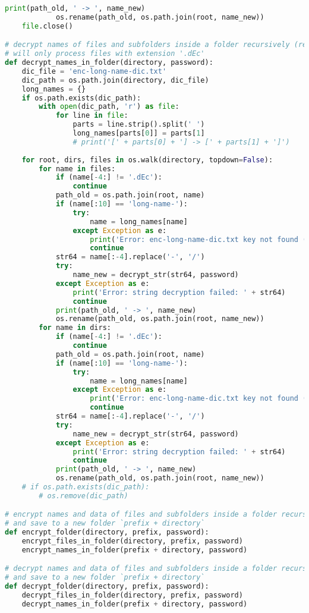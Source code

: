 \begin{lstlisting}[language=python,caption=encrypt.py]
			print(path_old, ' -> ', name_new)
			os.rename(path_old, os.path.join(root, name_new))
	file.close()

# decrypt names of files and subfolders inside a folder recursively (rename)
# will only process files with extension '.dEc'
def decrypt_names_in_folder(directory, password):
	dic_file = 'enc-long-name-dic.txt'
	dic_path = os.path.join(directory, dic_file)
	long_names = {}
	if os.path.exists(dic_path):
		with open(dic_path, 'r') as file:
			for line in file:
				parts = line.strip().split(' ')
				long_names[parts[0]] = parts[1]
				# print('[' + parts[0] + '] -> [' + parts[1] + ']')
				
	for root, dirs, files in os.walk(directory, topdown=False):
		for name in files:
			if (name[-4:] != '.dEc'):
			 	continue
			path_old = os.path.join(root, name)
			if (name[:10] == 'long-name-'):
				try:
					name = long_names[name]
				except Exception as e:
					print('Error: enc-long-name-dic.txt key not found (will skip): ' + name)
					continue
			str64 = name[:-4].replace('-', '/')
			try:
				name_new = decrypt_str(str64, password)
			except Exception as e:
				print('Error: string decryption failed: ' + str64)
				continue
			print(path_old, ' -> ', name_new)
			os.rename(path_old, os.path.join(root, name_new))
		for name in dirs:
			if (name[-4:] != '.dEc'):
			 	continue
			path_old = os.path.join(root, name)
			if (name[:10] == 'long-name-'):
				try:
					name = long_names[name]
				except Exception as e:
					print('Error: enc-long-name-dic.txt key not found (will skip): ' + name)
					continue
			str64 = name[:-4].replace('-', '/')
			try:
				name_new = decrypt_str(str64, password)
			except Exception as e:
				print('Error: string decryption failed: ' + str64)
				continue
			print(path_old, ' -> ', name_new)
			os.rename(path_old, os.path.join(root, name_new))
	# if os.path.exists(dic_path):
		# os.remove(dic_path)

# encrypt names and data of files and subfolders inside a folder recursively
# and save to a new folder `prefix + directory`
def encrypt_folder(directory, prefix, password):
	encrypt_files_in_folder(directory, prefix, password)
	encrypt_names_in_folder(prefix + directory, password)

# decrypt names and data of files and subfolders inside a folder recursively
# and save to a new folder `prefix + directory`
def decrypt_folder(directory, prefix, password):
	decrypt_files_in_folder(directory, prefix, password)
	decrypt_names_in_folder(prefix + directory, password)
\end{lstlisting}
